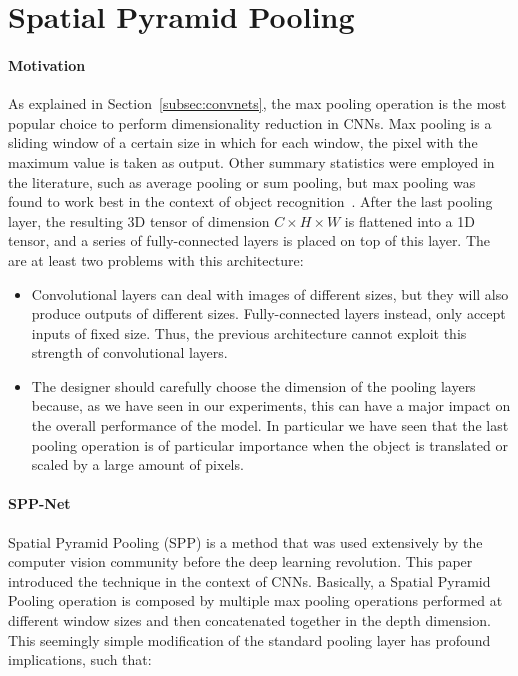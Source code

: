 \documentclass[../main.tex]{subfiles}
\begin{document}
    \section{Spatial Pyramid Pooling}\label{sec:spatialpyramidpooling}
    \paragraph{Motivation}
    As explained in Section~\ref{subsec:convnets}, the max pooling operation is the most popular
    choice to perform dimensionality reduction in CNNs. Max pooling is a sliding window of a certain size in which for each window,
	the pixel with the maximum value is taken as output.
	Other summary statistics were employed in the literature, such as average pooling or sum pooling, but max pooling was found to
	work best in the context of object recognition~\cite{maxpooling}.
    After the last pooling layer, the resulting 3D tensor of dimension $C \times H \times W$ is flattened into a 1D tensor,
    and a series of fully-connected layers is placed on top of this layer. The are at least two problems with this architecture:
    \begin{itemize}
        \item Convolutional layers can deal with images of different sizes, but they will also produce outputs of different sizes. Fully-connected
            layers instead, only accept inputs of fixed size. Thus, the previous architecture cannot exploit this strength of convolutional layers.
        \item The designer should carefully choose the dimension of the pooling layers because, as we have seen in our experiments, this can have
            a major impact on the overall performance of the model. In particular we have seen that the last pooling operation is of particular
            importance when the object is translated or scaled by a large amount of pixels.
    \end{itemize}
    
    \paragraph{SPP-Net}
    Spatial Pyramid Pooling (SPP) is a method that was used extensively by the computer vision community before the deep learning revolution.
    This paper~\cite{sppooling} introduced the technique in the context of CNNs. Basically, a Spatial Pyramid Pooling operation
    is composed by multiple max pooling operations performed at different window sizes and then concatenated together in the depth dimension.
    This seemingly simple modification of the standard pooling layer has profound implications, such that:
\end{document}
